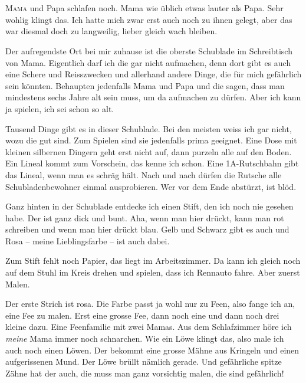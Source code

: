 \chapter*{}
\lettrine[lines=3]{\color{DeepPink}M}{ama} und Papa schlafen noch. Mama wie üblich etwas lauter als Papa.  Sehr wohlig klingt das. Ich hatte mich zwar erst auch noch zu ihnen gelegt, aber das war diesmal doch zu langweilig, lieber gleich wach bleiben. 

Der aufregendste Ort bei mir zuhause ist die oberste Schublade im Schreibtisch von Mama. Eigentlich darf ich die gar nicht aufmachen, denn dort gibt es auch eine Schere und Reisszwecken und allerhand andere Dinge, die für mich gefährlich sein könnten. Behaupten jedenfalls Mama und Papa und die sagen, dass man mindestens sechs Jahre alt sein muss, um da aufmachen zu dürfen. Aber ich kann ja spielen, ich sei schon so alt. 

Tausend Dinge gibt es in dieser Schublade. Bei den meisten weiss ich gar nicht, wozu die gut sind. Zum Spielen sind sie jedenfalls prima geeignet. Eine Dose mit kleinen silbernen Dingern geht erst nicht auf, dann purzeln alle auf den Boden. Ein Lineal kommt zum Vorschein, das kenne ich schon. Eine 1A-Rutschbahn gibt das Lineal, wenn man es schräg hält. Nach und nach dürfen die Rutsche alle Schubladenbewohner einmal ausprobieren. Wer vor dem Ende abstürzt, ist blöd. 

Ganz hinten in der Schublade entdecke ich einen Stift, den ich noch nie gesehen habe. Der ist ganz dick und bunt. Aha, wenn man hier drückt, kann man rot schreiben und wenn man hier drückt blau. Gelb und Schwarz gibt es auch und Rosa -- meine Lieblingsfarbe -- ist auch dabei.

Zum Stift fehlt noch Papier, das liegt im Arbeitszimmer. Da kann ich gleich noch auf dem Stuhl im Kreis drehen und spielen, dass ich Rennauto fahre. Aber zuerst Malen. 

Der erste Strich ist rosa. Die Farbe passt ja wohl nur zu Feen, also fange ich an, eine Fee zu malen. Erst eine grosse Fee, dann noch eine und dann noch drei kleine dazu. Eine Feenfamilie mit zwei Mamas. Aus dem Schlafzimmer höre ich \emph{meine} Mama immer noch schnarchen. Wie ein Löwe klingt das, also male ich auch noch einen Löwen. Der bekommt eine grosse Mähne aus Kringeln und einen aufgerissenen Mund. Der Löwe brüllt nämlich gerade. Und gefährliche spitze Zähne hat der auch, die muss man ganz vorsichtig malen, die sind gefährlich!

